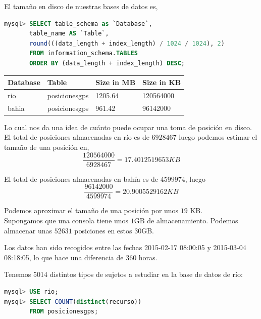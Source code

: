 \documentclass[a4paper, 12pt]{article}
\begin{document}
El tama\~no en disco de nuestras bases de datos es,

\begin{lstlisting}[language=sql, basicstyle=\small, columns=fullflexible, frame=tbrl, showstringspaces=false]
mysql> SELECT table_schema as `Database`, 
	   table_name AS `Table`,  
	   round(((data_length + index_length) / 1024 / 1024), 2) 
	   FROM information_schema.TABLES  
	   ORDER BY (data_length + index_length) DESC;

\end{lstlisting}

\begin{center}

	\begin{tabular}{| l | l | l | l |}
	\hline
	Database & Table & Size in MB & Size in KB \\
	\hline
	rio & posicionesgps & 1205.64 & 120564000 \\
	bahia & posicionesgps & 961.42 & 96142000 \\
	\hline
	\end{tabular}
\end{center}

Lo cual nos da una idea de cu\'anto puede ocupar una toma de posici\'on en disco.\\

El total de posiciones almacenadas en r\'io es de $6928467$ luego podemos estimar el tama\~no de una posici\'on en, \\
$$\frac{120564000}{6928467} = 17.4012519653 KB$$

El total de posiciones almacenadas en bah\'ia es de $4599974$, luego\\
$$\frac{96142000}{4599974} = 20.9005529162 KB$$

Podemos aproximar el tama\~no de una posici\'on por unos $19$ KB. \\

Supongamos que una consola tiene unos $1$GB de almacenamiento. Podemos almacenar unas $52631$ posiciones en estos 30GB. 

Los datos han sido recogidos entre las fechas 2015-02-17 08:00:05 y 2015-03-04 08:18:05, lo que hace una diferencia de 360 horas.

Tenemos 5014 distintos tipos de sujetos a estudiar en la base de datos de r\'io:

\begin{lstlisting}[language=sql, columns=fullflexible, basicstyle=\small, frame=tbrl, showstringspaces=false]
mysql> USE rio;
mysql> SELECT COUNT(distinct(recurso)) 
	   FROM posicionesgps;
\end{lstlisting}
\end{document}
